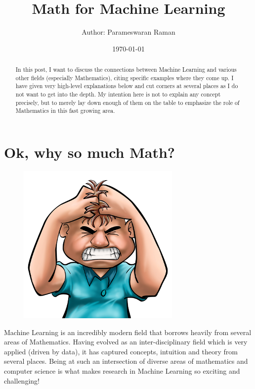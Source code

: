 \documentclass[a4paper]{article}
\title{Math for Machine Learning}
\author{Author: Parameswaran Raman}
\date{\today}
\begin{document}

\maketitle

\begin{abstract}
\noindent In this post, I want to discuss the connections between Machine Learning and various other fields (especially Mathematics), citing specific examples where they come up. I have given very high-level explanations below and cut corners at several places as I do not want to get into the depth. My intention here is not to explain any concept precisely, but to merely lay down enough of them on the table to emphasize the role of Mathematics in this fast growing area.
\end{abstract}

\section{Ok, why so much Math?}

\begin{figure}[!htb]\label{fig:AngryMan}
  \centering
  \includegraphics[width=0.3\columnwidth]{Angry_man_Cartoon}\\
\end{figure}

\noindent Machine Learning is an incredibly modern field that borrows heavily from several areas of Mathematics. Having evolved as an inter-disciplinary field which is very applied (driven by data), it has captured concepts, intuition and theory from several places. Being at such an intersection of diverse areas of mathematics and computer science is what makes research in Machine Learning so exciting and challenging! \\
\end{document}
